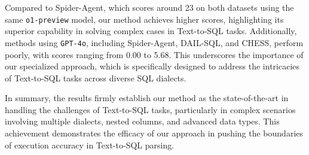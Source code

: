 Compared to Spider-Agent, which scores around 23 on both datasets using the same \texttt{o1-preview} model, our method achieves higher scores, highlighting its superior capability in solving complex cases in Text-to-SQL tasks. Additionally, methods using \texttt{GPT-4o}, including Spider-Agent, DAIL-SQL, and CHESS, perform poorly, with scores ranging from 0.00 to 5.68. This underscores the importance of our specialized approach, which is specifically designed to address the intricacies of Text-to-SQL tasks across diverse SQL dialects.

In summary, the results firmly establish our method as the state-of-the-art in handling the challenges of Text-to-SQL tasks, particularly in complex scenarios involving multiple dialects, nested columns, and advanced data types. This achievement demonstrates the efficacy of our approach in pushing the boundaries of execution accuracy in Text-to-SQL parsing.
